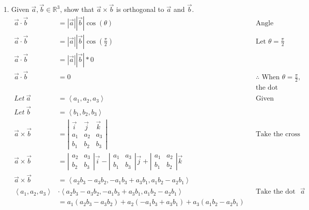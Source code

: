 \documentclass{article}
\newenvironment{problem}[1]{
    \begin{enumerate}
        \item[\bfseries{#1}]
}
{
    \end{enumerate}
}
\begin{document}
\begin{problem}{4}
    Given $\vec{a}, \vec{b} \in \mathbb{R}^3$, show that $\vec{a} \times \vec{b}$ is orthogonal to $\vec{a}$ and $\vec{b}$.
    \begin{align*}
        \vec{a} \cdot \vec{b} &= |\vec{a}| |\vec{b}| \cos(\theta) && \text{Angle between 2 vectors}\\
        \vec{a} \cdot \vec{b} &= |\vec{a}| |\vec{b}| \cos(\frac{\pi}{2}) && \text{Let $\theta = \frac{\pi}{2}$}\\
        \vec{a} \cdot \vec{b} &= |\vec{a}| |\vec{b}| * 0\\
        \vec{a} \cdot \vec{b} &= 0 && \text{$\therefore$ When $\theta = \frac{\pi}{2}$,}\\
        &&&\text{the dot product is equal to 0}\\
        Let\ \vec{a} &= \left\langle a_1, a_2, a_3 \right\rangle && \text{Given}\\
        Let\ \vec{b} &= \left\langle b_1, b_2, b_3 \right\rangle\\
        \vec{a} \times \vec{b} &= \left| {\begin{array}{*{20}{c}}{\vec i}&{\vec j}&{\vec k}\\{a_1}&{a_2}&{a_3}\\{b_1}&{b_2}&{b_3}\end{array}} \right| && \text{Take the cross product}\\
        \vec{a} \times \vec{b} &= \left| {\begin{array}{*{20}{c}}{a_2}&{a_3}\\{b_2}&{b_3}\end{array}} \right|\vec i - \left| {\begin{array}{*{20}{c}}{a_1}&{a_3}\\{b_1}&{b_3}\end{array}} \right|\vec j + \left| {\begin{array}{*{20}{c}}{a_1}&{a_2}\\{b_1}&{b_2}\end{array}} \right|\vec k\\
        \vec{a} \times \vec{b} &= \left\langle a_2b_3 - a_3b_2, -a_1b_3 + a_3b_1, a_1b_2 - a_2b_1 \right\rangle\\
        \left\langle a_1, a_2, a_3 \right\rangle &\cdot\left\langle a_2b_3 - a_3b_2, -a_1b_3 + a_3b_1, a_1b_2 - a_2b_1 \right\rangle && \text{Take the dot product with $\vec a$}\\
        &= a_1(a_2b_3 - a_3b_2) + a_2(-a_1b_3 + a_3b_1) + a_3(a_1b_2 - a_2b_1)\\

\end{align*}
\end{problem}
\end{document}
